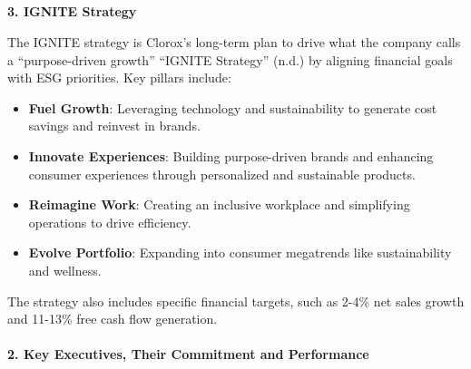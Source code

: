 \documentclass[
  letterpaper,
  DIV=11,
  numbers=noendperiod]{scrartcl}
\makeatletter
\let\oldparagraph\paragraph
\renewcommand{\paragraph}{
    \@ifstar
      \xxxParagraphStar
      \xxxParagraphNoStar
  }
\newcommand{\xxxParagraphStar}[1]{\oldparagraph*{#1}\mbox{}}
\newcommand{\xxxParagraphNoStar}[1]{\oldparagraph{#1}\mbox{}}
\let\oldsubparagraph\subparagraph
\renewcommand{\subparagraph}{
    \@ifstar
      \xxxSubParagraphStar
      \xxxSubParagraphNoStar
  }
\newcommand{\xxxSubParagraphStar}[1]{\oldsubparagraph*{#1}\mbox{}}
\newcommand{\xxxSubParagraphNoStar}[1]{\oldsubparagraph{#1}\mbox{}}
\providecommand{\tightlist}{%
  \setlength{\itemsep}{0pt}\setlength{\parskip}{0pt}}\usepackage{longtable,booktabs,array}
\makeatother
\begin{document}
\subparagraph{\texorpdfstring{\textbf{3. IGNITE
Strategy}}{3. IGNITE Strategy}}\label{ignite-strategy}

The IGNITE strategy is Clorox's long-term plan to drive what the company
calls a ``purpose-driven growth'' {``{IGNITE Strategy}''} (n.d.) by
aligning financial goals with ESG priorities. Key pillars include:

\begin{itemize}
\tightlist
\item
  \textbf{Fuel Growth}: Leveraging technology and sustainability to
  generate cost savings and reinvest in brands.\\
\item
  \textbf{Innovate Experiences}: Building purpose-driven brands and
  enhancing consumer experiences through personalized and sustainable
  products.\\
\item
  \textbf{Reimagine Work}: Creating an inclusive workplace and
  simplifying operations to drive efficiency.\\
\item
  \textbf{Evolve Portfolio}: Expanding into consumer megatrends like
  sustainability and wellness.
\end{itemize}

The strategy also includes specific financial targets, such as 2-4\% net
sales growth and 11-13\% free cash flow generation.

\paragraph{\texorpdfstring{\textbf{2. Key Executives, Their Commitment
and
Performance}}{2. Key Executives, Their Commitment and Performance}}\label{key-executives-their-commitment-and-performance}
\end{document}
